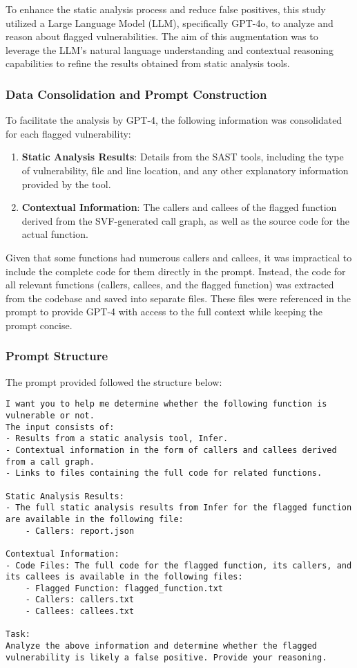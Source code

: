 To enhance the static analysis process and reduce false positives, this study utilized a Large Language Model (LLM), specifically GPT-4o, to analyze and reason about flagged vulnerabilities. The aim of this augmentation was to leverage the LLM's natural language understanding and contextual reasoning capabilities to refine the results obtained from static analysis tools.

\subsubsection{Data Consolidation and Prompt Construction}
To facilitate the analysis by GPT-4, the following information was consolidated for each flagged vulnerability:
\begin{enumerate}
    \item \textbf{Static Analysis Results}: Details from the SAST tools, including the type of vulnerability, file and line location, and any other explanatory information provided by the tool.
    \item \textbf{Contextual Information}: The callers and callees of the flagged function derived from the SVF-generated call graph, as well as the source code for the actual function.
\end{enumerate}

Given that some functions had numerous callers and callees, it was impractical to include the complete code for them directly in the prompt. Instead, the code for all relevant functions (callers, callees, and the flagged function) was extracted from the codebase and saved into separate files. These files were referenced in the prompt to provide GPT-4 with access to the full context while keeping the prompt concise.

\subsubsection{Prompt Structure}
The prompt provided followed the structure below:

\begin{lstlisting}[breaklines=true, caption={Prompt structure for GPT-4 analysis of flagged vulnerabilities.}, label={prompt}]
I want you to help me determine whether the following function is vulnerable or not.
The input consists of:
- Results from a static analysis tool, Infer.
- Contextual information in the form of callers and callees derived from a call graph.
- Links to files containing the full code for related functions.

Static Analysis Results:
- The full static analysis results from Infer for the flagged function are available in the following file:
    - Callers: report.json

Contextual Information:
- Code Files: The full code for the flagged function, its callers, and its callees is available in the following files:
    - Flagged Function: flagged_function.txt
    - Callers: callers.txt
    - Callees: callees.txt

Task:
Analyze the above information and determine whether the flagged vulnerability is likely a false positive. Provide your reasoning.
\end{lstlisting}


